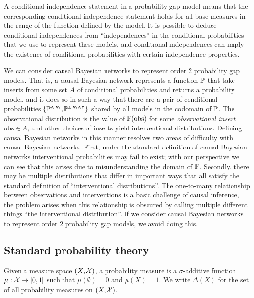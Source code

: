 A conditional independence statement in a probability gap model means that the corresponding conditional independence statement holds for all base measures in the range of the function defined by the model. It is possible to deduce conditional independences from ``independences'' in the conditional probabilities that we use to represent these models, and conditional independences can imply the existence of conditional probabilities with certain independence properties.

We can consider causal Bayesian networks to represent order 2 probability gap models. That is, a causal Bayesian network represents a function $\mathbb{P}$ that take inserts from some set $A$ of conditional probabilities and returns a probability model, and it does so in such a way that there are a pair of conditional probabilities $\{\mathbb{P}^{\mathsf{X}|\mathsf{W}},\mathbb{P}^{\mathsf{Z}|\mathsf{WXY}}\}$ shared by all models in the codomain of $\mathbb{P}$. The observational distribution is the value of $\mathbb{P}(\text{obs})$ for some \emph{observational insert} $\text{obs}\in A$, and other choices of inserts yield interventional distributions. Defining causal Bayesian networks in this manner resolves two areas of difficulty with causal Bayesian networks. First, under the standard definition of causal Bayesian networks interventional probabilities may fail to exist; with our perspective we can see that this arises due to misunderstanding the domain of $\mathbb{P}$. Secondly, there may be multiple distributions that differ in important ways that all satisfy the standard definition of ``interventional distributions''. The one-to-many relationship between observations and interventions is a basic challenge of causal inference, the problem arises when this relationship is obscured by calling multiple different things ``the interventional distribution''. If we consider causal Bayesian networks to represent order 2 probability gap models, we avoid doing this. 



\subsection{Standard probability theory}

\begin{definition}
Given a measure space $(X,\mathcal{X})$, a probability measure is a $\sigma$-additive function $\mu:\mathcal{X}\to [0,1]$ such that $\mu(\emptyset)=0$ and $\mu(X)=1$. We write $\Delta(X)$ for the set of all probability measures on $(X,\mathcal{X})$.
\end{definition}

